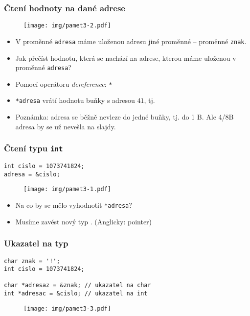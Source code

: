 \documentclass{beamer}
\newenvironment{itemizex}%
  {\large \begin{itemize}%
    \setlength{\itemsep}{8pt}%
    \setlength{\parskip}{8pt}}%
  {\end{itemize}}
\begin{document}
\begin{frame}[t,fragile]\frametitle{Čtení hodnoty na dané adrese} 
\begin{figure}[htb]
    \centering
    \texttt{[image: img/pamet3-2.pdf]}
\end{figure}

\begin{itemize}
    \item V proměnné \texttt{adresa} máme uloženou adresu jiné proměnné -- proměnné \texttt{znak}.
    \item Jak přečíst hodnotu, která se nachází na adrese, kterou máme uloženou v proměnné \texttt{adresa}?
    \item Pomocí operátoru \textit{dereference}: \texttt{*}
    \item \texttt{*adresa} vrátí hodnotu buňky s adresou $41$, tj. \uv{!}
    \item {\tiny Poznámka: adresa se běžně nevleze do jedné buňky, tj. do 1 B. Ale 4/8B adresa by se už nevešla na slajdy.}
\end{itemize}
\end{frame}



\begin{frame}[t,fragile]\frametitle{Čtení typu \texttt{int}} 
\begin{verbatim} 
int cislo = 1073741824; 
adresa = &cislo;
\end{verbatim}

\begin{figure}[htb]
    \centering
    \texttt{[image: img/pamet3-1.pdf]}
\end{figure}

\begin{itemizex}
    \item Na co by se mělo vyhodnotit \texttt{*adresa}?
    \item Musíme zavést nový typ . (Anglicky: pointer)
\end{itemizex}
\end{frame}


\begin{frame}[t,fragile]\frametitle{Ukazatel na typ} 
\begin{verbatim} 
char znak = '!';
int cislo = 1073741824;

char *adresaz = &znak; // ukazatel na char
int *adresac = &cislo; // ukazatel na int
\end{verbatim}
\begin{figure}[htb]
    \centering
    \texttt{[image: img/pamet3-3.pdf]}
\end{figure}
\end{frame}
\end{document}

